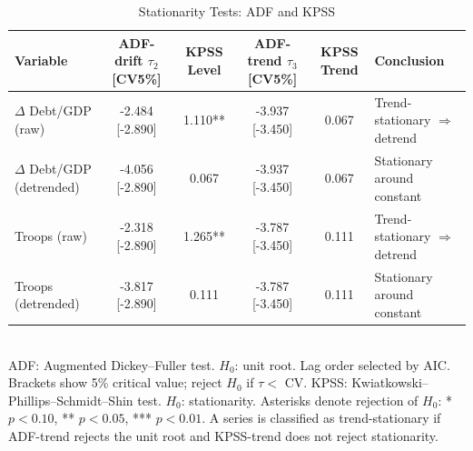 \begin{table}[htbp]
  \centering
  \caption{Stationarity Tests: ADF and KPSS}
  \label{tab:stationarity}
  \begin{tabular}{lccccl}
    \toprule
    Variable & ADF-drift $\tau_2$ [CV5\%] & KPSS Level & ADF-trend $\tau_3$ [CV5\%] & KPSS Trend & Conclusion \\
    \midrule
    $\Delta$ Debt/GDP (raw) & -2.484 [-2.890] & 1.110** & -3.937 [-3.450] & 0.067 & Trend-stationary $\Rightarrow$ detrend \\
    $\Delta$ Debt/GDP (detrended) & -4.056 [-2.890] & 0.067 & -3.937 [-3.450] & 0.067 & Stationary around constant \\
    Troops (raw) & -2.318 [-2.890] & 1.265** & -3.787 [-3.450] & 0.111 & Trend-stationary $\Rightarrow$ detrend \\
    Troops (detrended) & -3.817 [-2.890] & 0.111 & -3.787 [-3.450] & 0.111 & Stationary around constant \\
    \bottomrule
  \end{tabular}
  \\[2pt] \footnotesize{ADF: Augmented Dickey--Fuller test. $H_0$: unit root. Lag order selected by AIC. Brackets show 5\% critical value; reject $H_0$ if $\tau < $ CV. KPSS: Kwiatkowski--Phillips--Schmidt--Shin test. $H_0$: stationarity. Asterisks denote rejection of $H_0$: * $p<0.10$, ** $p<0.05$, *** $p<0.01$. A series is classified as trend-stationary if ADF-trend rejects the unit root and KPSS-trend does not reject stationarity.}
\end{table}
